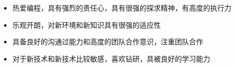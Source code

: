   \begin{itemize}[leftmargin=*]
    \item 热爱编程，具有强烈的责任心，具有很强的探求精神，有高度的执行力
    \item 乐观开朗，对新环境和新知识具有很强的适应性
    \item 具备良好的沟通过能力和高度的团队合作意识，注重团队合作
    \item 对于新技术和新技术比较敏感，喜欢钻研，具被良好的学习能力
  \end{itemize}